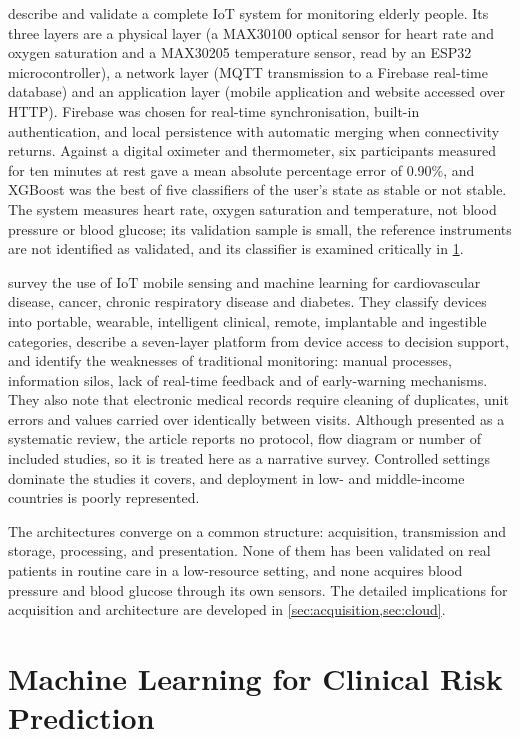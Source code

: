 \documentclass[12pt,a4paper,oneside]{report}
\begin{document}
\Textcite{efendi2025} describe and validate a complete IoT system for monitoring elderly people. Its three layers are a physical layer (a MAX30100 optical sensor for heart rate and oxygen saturation and a MAX30205 temperature sensor, read by an ESP32 microcontroller), a network layer (MQTT transmission to a Firebase real-time database) and an application layer (mobile application and website accessed over HTTP). Firebase was chosen for real-time synchronisation, built-in authentication, and local persistence with automatic merging when connectivity returns. Against a digital oximeter and thermometer, six participants measured for ten minutes at rest gave a mean absolute percentage error of 0.90\%, and XGBoost was the best of five classifiers of the user's state as stable or not stable. The system measures heart rate, oxygen saturation and temperature, not blood pressure or blood glucose; its validation sample is small, the reference instruments are not identified as validated, and its classifier is examined critically in \cref{sec:lr-ml}.

\Textcite{liu2025review} survey the use of IoT mobile sensing and machine learning for cardiovascular disease, cancer, chronic respiratory disease and diabetes. They classify devices into portable, wearable, intelligent clinical, remote, implantable and ingestible categories, describe a seven-layer platform from device access to decision support, and identify the weaknesses of traditional monitoring: manual processes, information silos, lack of real-time feedback and of early-warning mechanisms. They also note that electronic medical records require cleaning of duplicates, unit errors and values carried over identically between visits. Although presented as a systematic review, the article reports no protocol, flow diagram or number of included studies, so it is treated here as a narrative survey. Controlled settings dominate the studies it covers, and deployment in low- and middle-income countries is poorly represented.

The architectures converge on a common structure: acquisition, transmission and storage, processing, and presentation. None of them has been validated on real patients in routine care in a low-resource setting, and none acquires blood pressure and blood glucose through its own sensors. The detailed implications for acquisition and architecture are developed in \cref{sec:acquisition,sec:cloud}.

\section{Machine Learning for Clinical Risk Prediction}\label{sec:lr-ml}
\end{document}
